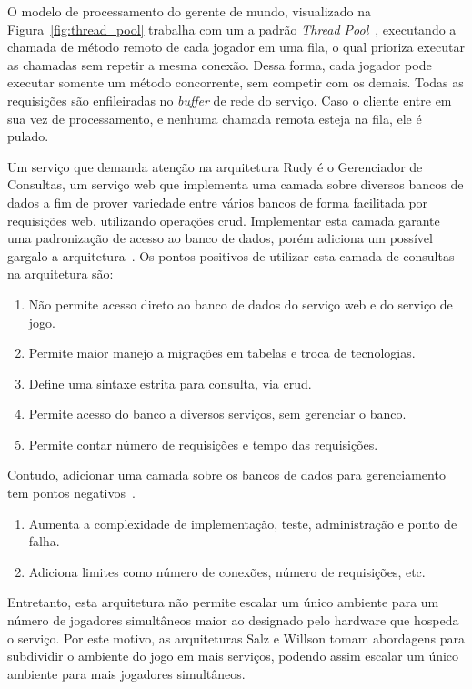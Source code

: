 O modelo de processamento do gerente de mundo, visualizado na Figura~\ref{fig:thread_pool} trabalha com um a padrão \textit{Thread Pool}~\cite{Ringler2014Dec, matthiasrudy2011}, executando a chamada de método remoto de cada jogador em uma fila, o qual prioriza executar as chamadas sem repetir a mesma conexão.
%
Dessa forma, cada jogador pode executar somente um método concorrente, sem competir com os demais. Todas as requisições são enfileiradas no \textit{buffer} de rede do serviço.
%
Caso o cliente entre em sua vez de processamento, e nenhuma chamada remota esteja na fila, ele é pulado.



Um serviço que demanda atenção na arquitetura Rudy é o Gerenciador de Consultas, um serviço web que implementa uma camada sobre diversos bancos de dados a fim de prover variedade entre vários bancos de forma facilitada por requisições web, utilizando operações \ac{crud}.
%
Implementar esta camada garante uma padronização de acesso ao banco de dados, porém adiciona um possível gargalo a arquitetura~\cite{matthiasrudy2011}.
%
Os pontos positivos de utilizar esta camada de consultas na arquitetura são:
\begin{enumerate}
  \item Não permite acesso direto ao banco de dados do serviço web e do serviço de jogo.
  \item Permite maior manejo a migrações em tabelas e troca de tecnologias.
  \item Define uma sintaxe estrita para consulta, via \ac{crud}.
  \item Permite acesso do banco a diversos serviços, sem gerenciar o banco.
  \item Permite contar número de requisições e tempo das requisições.
\end{enumerate}



Contudo, adicionar uma camada sobre os bancos de dados para gerenciamento tem pontos negativos~\cite{matthiasrudy2011}.

\begin{enumerate}
  \item Aumenta a complexidade de implementação, teste, administração e ponto de falha.
  \item Adiciona limites como número de conexões, número de requisições, etc.
\end{enumerate}

Entretanto, esta arquitetura não permite escalar um único ambiente para um número de jogadores simultâneos maior ao designado pelo hardware que hospeda o serviço.
%
Por este motivo, as arquiteturas Salz e Willson tomam abordagens para subdividir o ambiente do jogo em mais serviços, podendo assim escalar um único ambiente para mais jogadores simultâneos.



